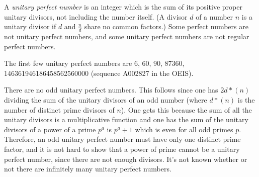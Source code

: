 \documentclass[12pt]{article}
\begin{document}
A {\em unitary perfect number} is an integer which is the sum of its positive proper unitary divisors, not including the number itself. (A divisor $d$ of a number $n$ is a unitary divisor if $d$ and $\frac{n}{d}$ share no common factors.) Some perfect numbers are not unitary perfect numbers, and some unitary perfect numbers are not regular perfect numbers.

The first few unitary perfect numbers are 6, 60, 90, 87360, 146361946186458562560000 (sequence A002827 in the OEIS).

There are no odd unitary perfect numbers. This follows since one has $2d*(n)$ dividing the sum of the unitary divisors of an odd number (where $d*(n)$ is the number of distinct prime divisors of $n$). One gets this because the sum of all the unitary divisors is a multiplicative function and one has the sum of the unitary divisors of a power of a prime $p^a$ is $p^a + 1$ which is even for all odd primes $p$. Therefore, an odd unitary perfect number must have only one distinct prime factor, and it is not hard to show that a power of prime cannot be a unitary perfect number, since there are not enough divisors. It's not known whether or not there are infinitely many unitary perfect numbers.

\end{document}
